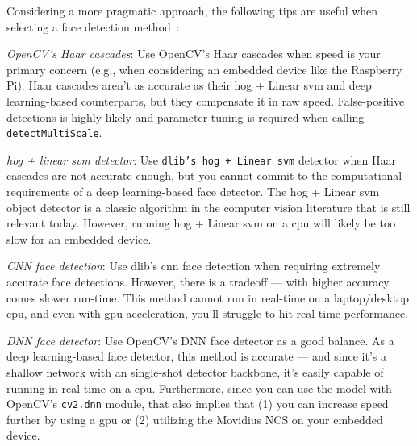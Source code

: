 Considering a more pragmatic approach, the following tips are useful when
selecting a face detection method~\cite{pyimage-face-bestpractices}:
\begin{enum-c}
\item \emph{OpenCV's Haar cascades}:
      Use OpenCV's Haar cascades when speed is your primary concern (e.g., when
      considering an embedded device like the Raspberry Pi). Haar cascades
      aren't as accurate as their \gls{hog} + Linear \gls{svm} and deep learning-based
      counterparts, but they compensate it in raw speed. False-positive
      detections is highly likely and parameter tuning is required when calling
      \texttt{detectMultiScale}.
\item \emph{\gls{hog} + linear \gls{svm} detector}:
    Use \texttt{dlib's \gls{hog} + Linear \gls{svm}} detector when Haar cascades are not
    accurate enough, but you cannot commit to the computational requirements of
    a deep learning-based face detector.
    The \gls{hog} + Linear \gls{svm} object detector is a classic algorithm in the computer
    vision literature that is still relevant today.
    However, running \gls{hog} + Linear \gls{svm} on a \gls{cpu} will likely be too slow for an
    embedded device.
  \item \emph{CNN face detection}:
    Use dlib's \gls{cnn} face detection when requiring extremely accurate face
    detections.
   However, there is a tradeoff --- with
   higher accuracy comes slower run-time.
   This method cannot run in real-time on a laptop/desktop \gls{cpu}, and even with
   \gls{gpu} acceleration, you'll struggle to hit real-time performance.
  \item \emph{DNN face detector}:
    Use OpenCV's DNN face detector as a good balance. As a deep learning-based
    face detector, this method is accurate --- and since it's a shallow network
    with an single-shot detector backbone, it's easily capable of running in
    real-time on a \gls{cpu}. Furthermore, since you can use the model with
    OpenCV's \texttt{cv2.dnn} module, that also implies that (1) you can
    increase speed further by using a \gls{gpu} or (2) utilizing the Movidius
    NCS on your embedded device.
\end{enum-c}


